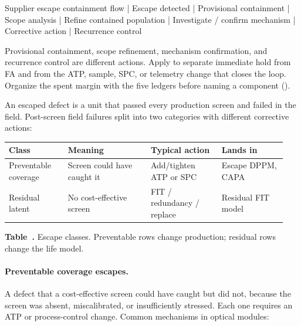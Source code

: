 \begin{dectree}
Supplier escape containment flow
  |
Escape detected
  |
Provisional containment
  |
Scope analysis
  |
Refine contained population
  |
Investigate / confirm mechanism
  |
Corrective action
  |
Recurrence control
\end{dectree}

Provisional containment, scope refinement, mechanism confirmation, and
recurrence control are different actions. Apply
 to separate
immediate hold from FA and from the ATP, sample, SPC, or telemetry change that
closes the loop. Organize the spent margin with the five ledgers before naming
a component ().

An escaped defect is a unit that passed every production screen and failed in the
field. Post-screen field failures split into two categories with different
corrective actions:

\begin{table}[ht]
\label{tab:escape-classes}%
\centering
\setlength{\tabcolsep}{3.5pt}%
\footnotesize
\renewcommand{\arraystretch}{1.25}%
\begin{tabular}{@{}p{0.20\linewidth}p{0.28\linewidth}p{0.24\linewidth}p{0.22\linewidth}@{}}
\toprule
Class & Meaning & Typical action & Lands in \\
\midrule
Preventable coverage & Screen could have caught it & Add/tighten ATP or SPC & Escape DPPM, CAPA \\
\addlinespace[1.5em]
Residual latent & No cost-effective screen & FIT / redundancy / replace & Residual FIT model \\
\bottomrule
\end{tabular}
\par\medskip
{\raggedright\footnotesize\textbf{Table~\thetable.} Escape classes. Preventable rows
change production; residual rows change the life model.\par}
\end{table}
\FloatBarrier

\paragraph{Preventable coverage escapes.}
A defect that a cost-effective screen could have caught but did not, because the
screen was absent, miscalibrated, or insufficiently stressed. Each one requires an
ATP or process-control change. Common mechanisms in optical modules:

